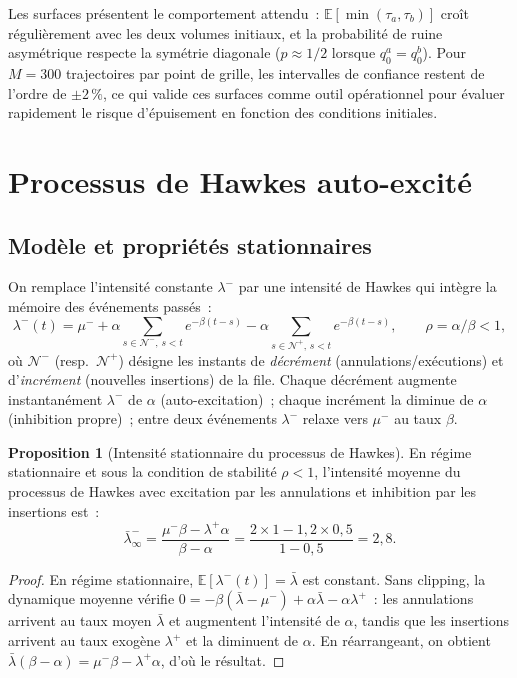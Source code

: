 \documentclass[11pt,a4paper]{article}
\theoremstyle{definition}
\newtheorem{proposition}{Proposition}[section]
\newcommand{\E}{\mathbb{E}}
\begin{document}
Les surfaces présentent le comportement attendu~: $\E[\min(\tau_a,\tau_b)]$ croît régulièrement avec les deux volumes initiaux, et la probabilité de ruine asymétrique respecte la symétrie diagonale ($p\approx1/2$ lorsque $q_0^a=q_0^b$). Pour $M=300$ trajectoires par point de grille, les intervalles de confiance restent de l'ordre de $\pm2\,\%$, ce qui valide ces surfaces comme outil opérationnel pour évaluer rapidement le risque d'épuisement en fonction des conditions initiales.

\section{Processus de Hawkes auto-excité}
\label{sec:hawkes_indiv}

\subsection{Modèle et propriétés stationnaires}

On remplace l'intensité constante $\lambda^-$ par une intensité de Hawkes
qui intègre la mémoire des événements passés~:
\[
  \lambda^-(t) = \mu^-
  + \alpha\!\!\sum_{s\in\mathcal{N}^-,\,s<t}\!\!e^{-\beta(t-s)}
  - \alpha\!\!\sum_{s\in\mathcal{N}^+,\,s<t}\!\!e^{-\beta(t-s)},
  \qquad \rho=\alpha/\beta<1,
\]
où $\mathcal{N}^-$ (resp.\ $\mathcal{N}^+$) désigne les instants de
\emph{décrément} (annulations/exécutions) et d'\emph{incrément} (nouvelles
insertions) de la file. Chaque décrément augmente instantanément $\lambda^-$
de $\alpha$ (auto-excitation)~; chaque incrément la diminue de $\alpha$
(inhibition propre)~; entre deux événements $\lambda^-$ relaxe vers $\mu^-$
au taux $\beta$.

\begin{proposition}[Intensité stationnaire du processus de Hawkes]
\label{prop:hawkes_stat}
En régime stationnaire et sous la condition de stabilité $\rho<1$,
l'intensité moyenne du processus de Hawkes avec excitation par les
annulations et inhibition par les insertions est~:
\[
  \bar\lambda^-_\infty
  = \frac{\mu^-\beta - \lambda^+\alpha}{\beta - \alpha}
  = \frac{2\times1 - 1{,}2\times0{,}5}{1-0{,}5}
  = 2{,}8.
\]
\end{proposition}

\begin{proof}
En régime stationnaire, $\E[\lambda^-(t)]=\bar\lambda$ est constant.
Sans clipping, la dynamique moyenne vérifie
$0=-\beta(\bar\lambda-\mu^-)+\alpha\bar\lambda-\alpha\lambda^+$~:
les annulations arrivent au taux moyen $\bar\lambda$ et augmentent l'intensité
de $\alpha$, tandis que les insertions arrivent au taux exogène $\lambda^+$
et la diminuent de $\alpha$. En réarrangeant, on obtient
$\bar\lambda(\beta-\alpha) = \mu^-\beta - \lambda^+\alpha$,
d'où le résultat.
\end{proof}
\end{document}
